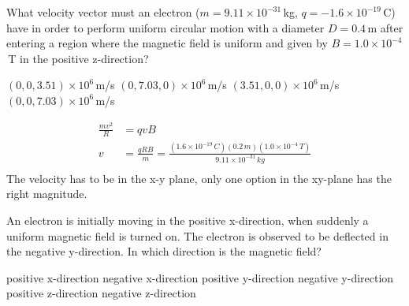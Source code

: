 \question What velocity vector must an electron ($m=9.11\times 10^{-31}$\,kg, $q=-1.6\times 10^{-19}$\,C) have in order to perform uniform circular motion with a diameter $D=0.4$\,m after entering a region where the magnetic field is uniform and given by $B=1.0\times 10^{-4}$\,T in the positive z-direction?
\begin{checkboxes}
\choice $(0,0,3.51)\times 10^{6}$\,m/s 
\choice $(0,7.03,0)\times 10^{6}$\,m/s 
\CorrectChoice $(3.51,0,0)\times 10^{6}$\,m/s \correct
\choice $(0,0,7.03)\times 10^{6}$\,m/s 
\end{checkboxes}
\begin{solution}
\begin{align*}
\frac{mv^2}{R}&=qvB\\
v&=\frac{qRB}{m}=\frac{(1.6\times 10^{-19}\,C)(0.2\,m)(1.0\times 10^{-4}\,T)}{9.11\times 10^{-31}\,kg}\\
\end{align*}
The velocity has to be in the x-y plane, only one option in the xy-plane has the right magnitude.
\end{solution}

\question An electron is initially moving in the positive x-direction, when suddenly a uniform magnetic field is turned on. The electron is observed to be deflected in the negative y-direction. In which direction is the magnetic field?
\begin{checkboxes}
\choice positive x-direction
\choice negative x-direction
\choice positive y-direction
\choice negative y-direction
\choice positive z-direction
\CorrectChoice negative z-direction \correct
\end{checkboxes}
\newpage
%
%
